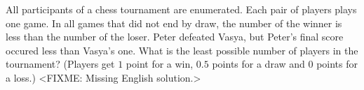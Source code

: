\problem{}
All participants of a chess tournament are enumerated.
Each pair of players plays one game.
In all games that did not end by draw, the number of the winner is less than the number of the loser.
Peter defeated Vasya, but Peter's final score occured less than Vasya's one.
What is the least possible number of players in the tournament?
(Players get $1$ point for a win, $0.5$ points for a draw and $0$ points for a loss.)
\solution
<FIXME: Missing English solution.>
\endproblem
